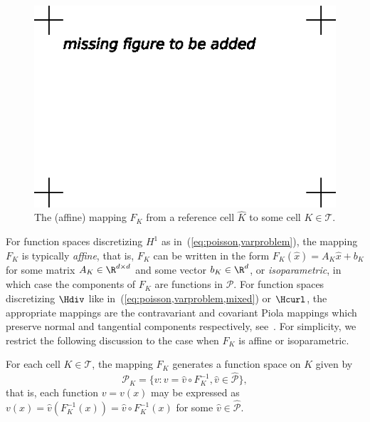 \begin{figure}[htbp]
  \begin{center}
    \includegraphics[width=\largewidth]{chapters/kirby-7/eps/missing-figure.eps}
    \caption{The (affine) mapping $F_K$ from a reference cell $\hat{K}$
      to some cell $K \in \mathcal{T}$.}
    \label{fig:affinemap}
  \end{center}
\end{figure}

For function spaces discretizing $H^1$ as
in~(\ref{eq:poisson,varproblem}), the mapping $F_K$ is typically
\emph{affine}, that is, $F_K$ can be written in the form $F_K(\hat{x})
= A_K \hat{x} + b_K$ for some matrix $A_K \in \R^{d\times d}$ and some
vector $b_K \in \R^d$, or \emph{isoparametric}, in which case the
components of $F_K$ are functions in $\hat{\mathcal{P}}$. For function
spaces discretizing $\Hdiv$ like
in~(\ref{eq:poisson,varproblem,mixed}) or $\Hcurl$, the appropriate
mappings are the contravariant and covariant Piola mappings which
preserve normal and tangential components respectively,
see~\cite{RognesKirbyEtAl2008}. For simplicity, we restrict the
following discussion to the case when $F_K$ is affine or
isoparametric.

For each cell $K \in \mathcal{T}$, the mapping $F_K$ generates a
function space on $K$ given by
\begin{equation}
  \mathcal{P}_K = \{ v : v = \hat{v} \circ F_K^{-1}, \hat{v} \in
  \hat{\mathcal{P}} \},
\end{equation}
that is, each function $v = v(x)$ may be expressed as $v(x) =
\hat{v}(F_K^{-1}(x)) = \hat{v} \circ F_K^{-1} (x)$ for some $\hat{v}
\in \hat{\mathcal{P}}$.

